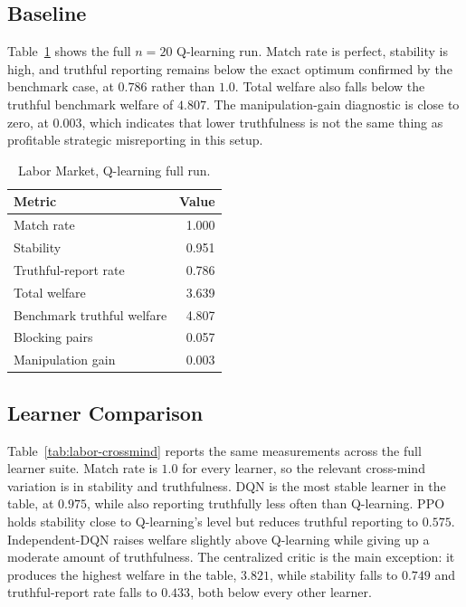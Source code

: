\documentclass[11pt]{article}
\begin{document}
\subsection{Baseline}

Table~\ref{tab:labor-baseline} shows the full \(n=20\) Q-learning run. Match
rate is perfect, stability is high, and truthful reporting remains below the
exact optimum confirmed by the benchmark case, at \(0.786\) rather than
\(1.0\). Total welfare also falls below the truthful benchmark welfare of
\(4.807\). The manipulation-gain diagnostic is close to zero, at \(0.003\),
which indicates that lower truthfulness is not the same thing as profitable
strategic misreporting in this setup.

\begin{table}[h]
\centering
\begin{tabular}{lr}
\toprule
Metric & Value \\
\midrule
Match rate & 1.000 \\
Stability & 0.951 \\
Truthful-report rate & 0.786 \\
Total welfare & 3.639 \\
Benchmark truthful welfare & 4.807 \\
Blocking pairs & 0.057 \\
Manipulation gain & 0.003 \\
\bottomrule
\end{tabular}
\caption{Labor Market, Q-learning full run.}
\label{tab:labor-baseline}
\end{table}

\subsection{Learner Comparison}

Table~\ref{tab:labor-crossmind} reports the same measurements across the full
learner suite. Match rate is \(1.0\) for every learner, so the relevant
cross-mind variation is in stability and truthfulness. DQN is the most stable
learner in the table, at \(0.975\), while also reporting truthfully less often
than Q-learning. PPO holds stability close to Q-learning's level but reduces
truthful reporting to \(0.575\). Independent-DQN raises welfare slightly above
Q-learning while giving up a moderate amount of truthfulness. The centralized
critic is the main exception: it produces the highest welfare in the table,
\(3.821\), while stability falls to \(0.749\) and truthful-report rate falls to
\(0.433\), both below every other learner.
\end{document}

